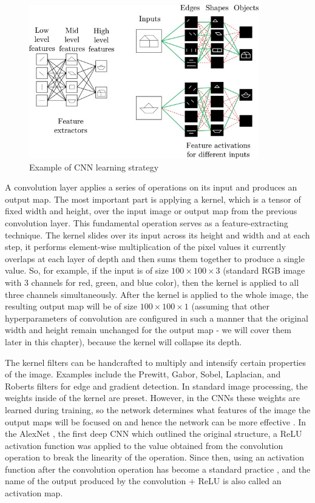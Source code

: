 \begin{figure}[H]
\begin{centering}
\includegraphics[width=10cm]{assets/images/cnn.jpg}
\par\end{centering}
\caption{Example of CNN learning strategy \cite{Santosh2022-2}}
\label{fig:cnn}
\end{figure}

A convolution layer applies a series of operations on its input and produces an output map. The most important part is applying a kernel, which is a tensor of fixed width and height, over the input image or output map from the previous convolution layer. This fundamental operation serves as a feature-extracting technique. The kernel slides over its input across its height and width and at each step, it performs element-wise multiplication of the pixel values it currently overlaps at each layer of depth and then sums them together to produce a single value. So, for example, if the input is of size $100\!\times\!100\!\times\!3$ (standard RGB image with 3 channels for red, green, and blue color), then the kernel is applied to all three channels simultaneously. After the kernel is applied to the whole image, the resulting output map will be of size $100\!\times\!100\!\times\!1$ (assuming that other hyperparameters of convolution are configured in such a manner that the original width and height remain unchanged for the output map - we will cover them later in this chapter), because the kernel will collapse its depth. 

The kernel filters can be handcrafted to multiply and intensify certain properties of the image. Examples include the Prewitt, Gabor, Sobel, Laplacian, and Roberts filters for edge and gradient detection. In standard image processing, the weights inside of the kernel are preset. However, in the CNNs these weights are learned during training, so the network determines what features of the image the output maps will be focused on and hence the network can be more effective \cite{Santosh2022-2, He2023}. In the AlexNet \cite{Krizhevsky2012}, the first deep CNN which outlined the original structure, a ReLU activation function was applied to the value obtained from the convolution operation to break the linearity of the operation. Since then, using an activation function after the convolution operation has become a standard practice \cite{Santosh2022-2, He2023}, and the name of the output produced by the convolution + ReLU is also called an activation map.

